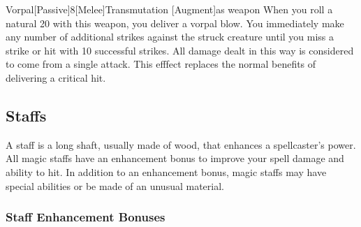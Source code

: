             \begin{magicitemdef}{Vorpal}[Passive]{8}[Melee]{Transmutation [Augment]}{as weapon}
                 When you roll a natural 20 with this weapon, you deliver a vorpal blow.
                You immediately make any number of additional strikes against the struck creature until you miss a strike or hit with 10 successful strikes.
                All damage dealt in this way is considered to come from a single attack.
                This efffect replaces the normal benefits of delivering a critical hit.
            \end{magicitemdef}

            \begin{comment}
            \subsection{Rods}

                Rods are scepterlike devices that have unique magical powers and do not usually have charges.
                Anyone can use a rod.

                \parhead{Physical Description} Rods weigh approximately 5 pounds.

                They range from 2 feet to 3 feet long and are usually made of iron or some other metal.
                (Many, as noted in their descriptions, can function as light maces or clubs due to their sturdy construction.)

                These sturdy items have AC 9, 10 hit points, hardness 10, and a break DR of 27.

                \parhead{Activation} Details relating to rod use vary from item to item.
                See the individual descriptions for specifics.
            \end{comment}

        \subsection{Staffs}

            A staff is a long shaft, usually made of wood, that enhances a spellcaster's power.
            All magic staffs have an enhancement bonus to improve your spell damage and ability to hit.
            In addition to an enhancement bonus, magic staffs may have special abilities or be made of an unusual material.

            \subsubsection{Staff Enhancement Bonuses}\label{Staff Enhancement Bonuses}

